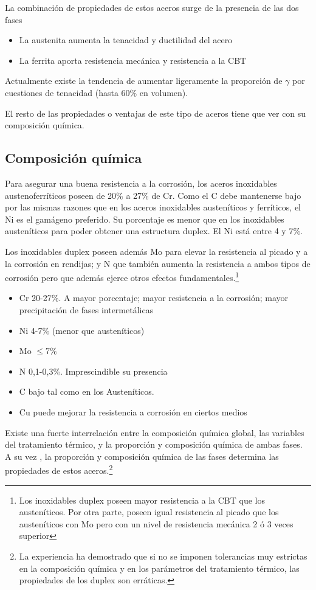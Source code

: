 La combinación de propiedades de estos aceros surge de la presencia de las dos fases

\begin{itemize}
	\item La austenita aumenta la tenacidad y ductilidad del acero
	\item La ferrita aporta resistencia mecánica y resistencia a la CBT
\end{itemize}

Actualmente existe la tendencia de aumentar ligeramente la proporción de $\gamma$ por cuestiones de tenacidad (hasta 60\% en volumen).

El resto de las propiedades o ventajas de este tipo de aceros tiene que ver con su composición química.

\subsection{Composición química}

Para asegurar una buena resistencia a la corrosión, los aceros inoxidables austenoferríticos poseen de 20\% a 27\% de Cr. Como el C debe mantenerse bajo por las mismas razones que en los aceros inoxidables austeníticos y ferríticos, el Ni es el gamágeno preferido. Su porcentaje es menor que en los inoxidables austeníticos para poder obtener una estructura duplex. El Ni está entre 4 y 7\%.

Los inoxidables duplex poseen además Mo para elevar la resistencia al picado y a la corrosión en rendijas; y N que también aumenta la resistencia a ambos tipos de corrosión pero que además ejerce otros efectos fundamentales.\footnote{Los inoxidables duplex poseen mayor resistencia a la CBT que los austeníticos. Por otra parte, poseen igual resistencia al picado que los austeníticos con Mo pero con un nivel de resistencia mecánica 2 ó 3 veces superior}

\begin{itemize}
	\item Cr 20-27\%. A mayor porcentaje; mayor resistencia a la corrosión; mayor precipitación de fases intermetálicas
	\item Ni 4-7\% (menor que austeníticos)
	\item Mo $\leq7\%$
	\item N 0,1-0,3\%. Imprescindible su presencia
	\item C bajo tal como en los Austeníticos.
	\item Cu puede mejorar la resistencia a corrosión en ciertos medios
\end{itemize}
Existe una fuerte  interrelación entre la composición química global, las variables del tratamiento térmico, y la proporción y composición química de ambas fases. A su vez , la proporción y composición química de las fases determina las propiedades de estos aceros.\footnote{La experiencia ha demostrado que si no se imponen tolerancias muy estrictas en la composición química y en los parámetros del tratamiento térmico, las propiedades de los duplex son erráticas.}


